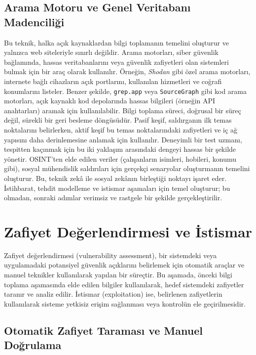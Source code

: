 \subsection{Arama Motoru ve Genel Veritabanı Madenciliği}

Bu teknik, halka açık kaynaklardan bilgi toplamanın temelini oluşturur ve yalnızca web siteleriyle sınırlı değildir. Arama motorları, siber güvenlik bağlamında, hassas veritabanlarını veya güvenlik zafiyetleri olan sistemleri bulmak için bir araç olarak kullanılır. Örneğin, \textit{Shodan} gibi özel arama motorları, internete bağlı cihazların açık portlarını, kullanılan hizmetleri ve coğrafi konumlarını listeler. Benzer şekilde, \texttt{grep.app} veya \texttt{SourceGraph} gibi kod arama motorları, açık kaynaklı kod depolarında hassas bilgileri (örneğin API anahtarları) aramak için kullanılabilir.
Bilgi toplama süreci, doğrusal bir süreç değil, sürekli bir geri besleme döngüsüdür. Pasif keşif, saldırganın ilk temas noktalarını belirlerken, aktif keşif bu temas noktalarındaki zafiyetleri ve iç ağ yapısını daha derinlemesine anlamak için kullanılır. Deneyimli bir test uzmanı, tespitten kaçınmak için bu iki yaklaşım arasındaki dengeyi hassas bir şekilde yönetir. OSINT'ten elde edilen veriler (çalışanların isimleri, hobileri, konumu gibi), sosyal mühendislik saldırıları için gerçekçi senaryolar oluşturmanın temelini oluşturur. Bu, teknik zekâ ile sosyal zekânın birleştiği noktayı işaret eder. İstihbarat, tehdit modelleme ve istismar aşamaları için temel oluşturur; bu olmadan, sonraki adımlar verimsiz ve rastgele bir şekilde gerçekleştirilir.

\section{Zafiyet Değerlendirmesi ve İstismar}

Zafiyet değerlendirmesi (vulnerability assessment), bir sistemdeki veya uygulamadaki potansiyel güvenlik açıklarını belirlemek için otomatik araçlar ve manuel teknikler kullanılarak yapılan bir süreçtir. Bu aşamada, önceki bilgi toplama aşamasında elde edilen bilgiler kullanılarak, hedef sistemdeki zafiyetler taranır ve analiz edilir. İstismar (exploitation) ise, belirlenen zafiyetlerin kullanılarak sisteme yetkisiz erişim sağlanması veya kontrolün ele geçirilmesidir.

\subsection{Otomatik Zafiyet Taraması ve Manuel Doğrulama}

